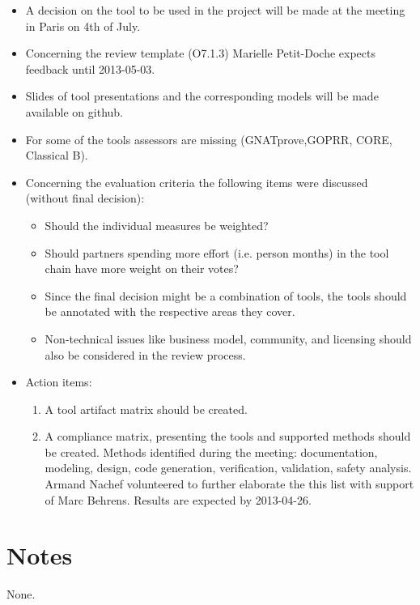 \documentclass[a4paper, 11pt]{article}
\begin{document}
\begin{itemize}
\item A decision on the tool to be used in the project will be made at the meeting in Paris on 4th of July.
\item Concerning the review template (O7.1.3) Marielle Petit-Doche expects feedback until 2013-05-03.
\item Slides of tool presentations and the corresponding models will be made available on github.
\item For some of the tools assessors are missing (GNATprove,GOPRR, CORE, Classical B).
\item Concerning the evaluation criteria the following items were discussed (without final decision):
\begin{itemize}
\item Should the individual measures be weighted?
\item Should partners spending more effort (i.e. person months) in the tool chain have more weight on their votes?
\item Since the final decision might be a combination of tools, the tools should be annotated with the respective areas they cover.
\item Non-technical issues like business model, community, and licensing should also be considered in the review process.
\end{itemize}
\item Action items:
\begin{enumerate}
\item A tool artifact matrix should be created.
\item A compliance matrix, presenting the tools and supported methods should be created. Methods identified during the meeting:
documentation, modeling, design, code generation, verification, validation, safety analysis. Armand Nachef volunteered to further elaborate the this list with support of Marc Behrens. Results are expected by 2013-04-26.
\end{enumerate}
\end{itemize}


\section{Notes}
None.
\end{document}
